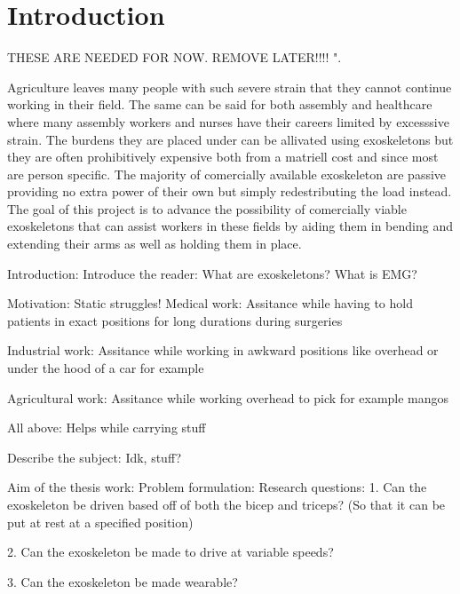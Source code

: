 \section{Introduction}
\label{section:intro}

THESE ARE NEEDED FOR NOW. REMOVE LATER!!!! \cite{workdemands}".

Agriculture leaves many people with such severe strain that they cannot continue working in their field. The same can be said 
for both assembly and healthcare where many assembly workers and nurses have their careers limited by excesssive strain. The 
burdens they are placed under can be allivated using exoskeletons but they are often prohibitively expensive both from a 
matriell cost and since most are person specific. The majority of comercially available exoskeleton are passive providing no 
extra power of their own but simply redestributing the load instead. The goal of this project is to advance the possibility of 
comercially viable exoskeletons that can assist workers in these fields by aiding them in bending and extending their arms as 
well as holding them in place.

Introduction:
    Introduce the reader:
        What are exoskeletons?
        What is EMG?

    Motivation:
        Static struggles!
            Medical work:
                Assitance while having to hold patients in exact positions for long durations during surgeries

            Industrial work:
                Assitance while working in awkward positions like overhead or under the hood of a car for example

            Agricultural work:
                Assitance while working overhead to pick for example mangos
            
            All above:
                Helps while carrying stuff

    Describe the subject:
        Idk, stuff?

    Aim of the thesis work:
        Problem formulation: %
            Research questions:
                1.	Can the exoskeleton be driven based off of both the bicep and triceps? (So that it can be put at rest at a specified position)

                2.	Can the exoskeleton be made to drive at variable speeds?

                3.	Can the exoskeleton be made wearable?

